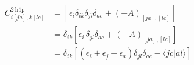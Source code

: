 \begin{align}
    C_{i[ja],k[lc]}^{2 \mathrm{~h} 1 \mathrm{p}} &= \left[\epsilon_i \delta_{ik} \delta_{jl} \delta_{ac} + (-A)_{[ja],[lc]}\right] \\
    &= \delta_{ik} \left[\epsilon_i\, \delta_{jl} \delta_{ac} + (-A)_{[ja],[lc]}\right] \\
    &= \delta_{ik} \left[ \left(\epsilon_i + \epsilon_j - \epsilon_a \right) \delta_{jl} \delta_{ac} - \langle jc | al \rangle \right]
\label{tda_kron}
\end{align}



